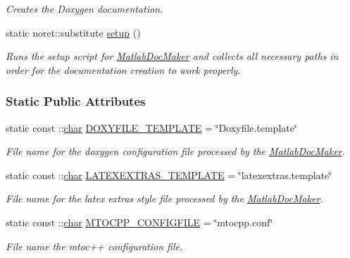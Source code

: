 \begin{DoxyCompactItemize}
\begin{DoxyCompactList}\small\item\em Creates the Doxygen documentation. \end{DoxyCompactList}\item 
static noret\+::substitute \hyperlink{class_matlab_doc_maker_a434c176c2421dd18a40003919b19f4f2}{setup} ()
\begin{DoxyCompactList}\small\item\em Runs the setup script for \hyperlink{class_matlab_doc_maker}{Matlab\+Doc\+Maker} and collects all necessary paths in order for the documentation creation to work properly. \end{DoxyCompactList}\end{DoxyCompactItemize}
\subsubsection*{Static Public Attributes}
\begin{DoxyCompactItemize}
\item 
static const \+::\hyperlink{classchar}{char} \hyperlink{class_matlab_doc_maker_ab9514d0ba074c3b92a7fae2b50846b90}{D\+O\+X\+Y\+F\+I\+L\+E\+\_\+\+T\+E\+M\+P\+L\+A\+TE} = \char`\"{}Doxyfile.\+template\char`\"{}
\begin{DoxyCompactList}\small\item\em File name for the doxygen configuration file processed by the \hyperlink{class_matlab_doc_maker}{Matlab\+Doc\+Maker}. \end{DoxyCompactList}\item 
static const \+::\hyperlink{classchar}{char} \hyperlink{class_matlab_doc_maker_a5fd9647b943b91d54acbfce17d0d7416}{L\+A\+T\+E\+X\+E\+X\+T\+R\+A\+S\+\_\+\+T\+E\+M\+P\+L\+A\+TE} = \char`\"{}latexextras.\+template\char`\"{}
\begin{DoxyCompactList}\small\item\em File name for the latex extras style file processed by the \hyperlink{class_matlab_doc_maker}{Matlab\+Doc\+Maker}. \end{DoxyCompactList}\item 
static const \+::\hyperlink{classchar}{char} \hyperlink{class_matlab_doc_maker_ab61ab79ccd92642c4fef74c6abbee559}{M\+T\+O\+C\+P\+P\+\_\+\+C\+O\+N\+F\+I\+G\+F\+I\+LE} = \char`\"{}mtocpp.\+conf\char`\"{}
\begin{DoxyCompactList}\small\item\em File name the mtoc++ configuration file. \end{DoxyCompactList}\end{DoxyCompactItemize}


